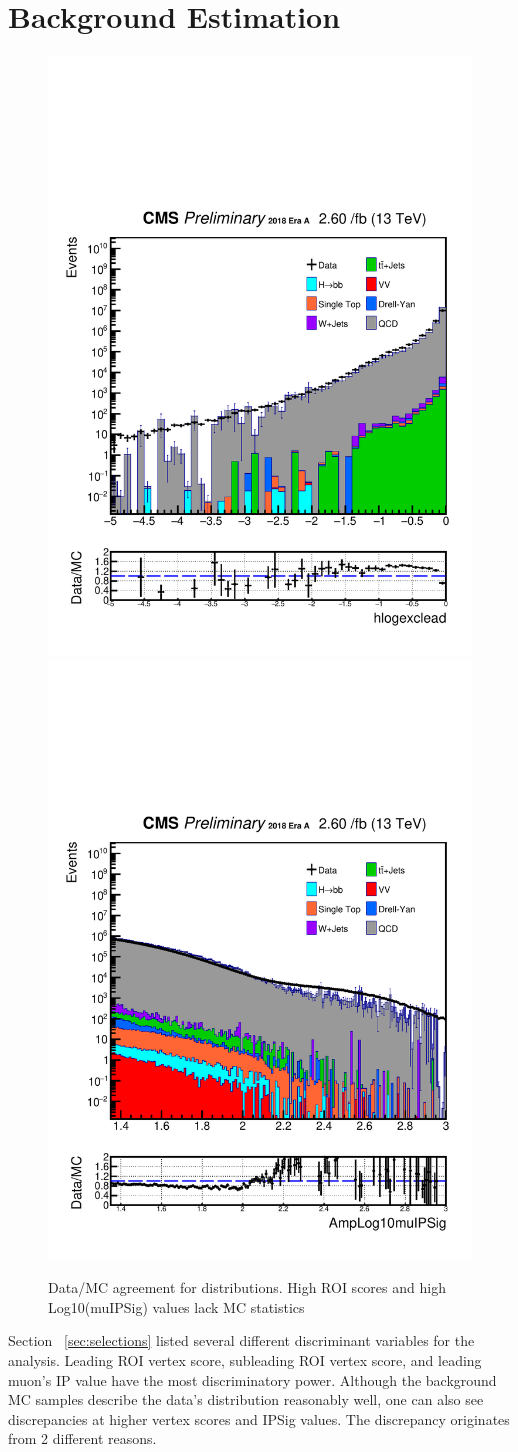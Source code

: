 \clearpage
\chapter{Background Estimation}\label{sec:estimate}

\begin{figure}[h!]
	\caption{Data/MC agreement for distributions. High ROI scores and high Log10(muIPSig) values lack MC statistics}
  \label{fig:DataMCscore5}
  \centering
  \includegraphics[width=0.40\linewidth]{figs/Data_log_AnalysisNote_MS-15_ctauS-10_hlogexclead.pdf}
  \includegraphics[width=0.40\linewidth]{figs/Data_log_AnalysisNote_MS-15_ctauS-10_AmpLog10muIPSig.pdf}

\end{figure}
Section ~\ref{sec:selections} listed several different discriminant variables for the analysis.
Leading ROI vertex score, subleading ROI vertex score, and leading muon's IP value have the most discriminatory power.
Although the background MC samples describe the data's distribution reasonably well, one can also see discrepancies at higher vertex scores and IPSig values.
The discrepancy originates from 2 different reasons.
